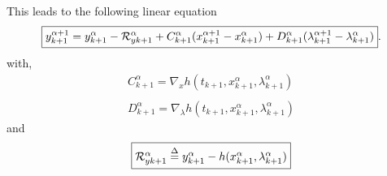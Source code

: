 This leads to the following linear equation
\begin{equation}
  \boxed{y^{\alpha+1}_{k+1} =  y^{\alpha}_{k+1}
  -\mathcal R^{\alpha}_{yk+1}+ \\
  C^{\alpha}_{k+1}(x^{\alpha+1}_{k+1}-x^{\alpha}_{k+1}) +
  D^{\alpha}_{k+1}(\lambda^{\alpha+1}_{k+1}-\lambda^{\alpha}_{k+1})}. \label{eq:NL11y}
\end{equation}
with,
\begin{equation}
     \begin{array}{l}
  C^{\alpha}_{k+1} = \nabla_xh(t_{k+1}, x^{\alpha}_{k+1},\lambda^{\alpha}_{k+1} ) \\ \\
  D^{\alpha}_{k+1} = \nabla_{\lambda}h(t_{k+1}, x^{\alpha}_{k+1},\lambda^{\alpha}_{k+1})
 \end{array}
\end{equation}
and
\begin{equation}\fbox{$
\mathcal R^{\alpha}_{yk+1} \stackrel{\Delta}{=} y^{\alpha}_{k+1} - h(x^{\alpha}_{k+1},\lambda^{\alpha}_{k+1})$}
 \end{equation}
